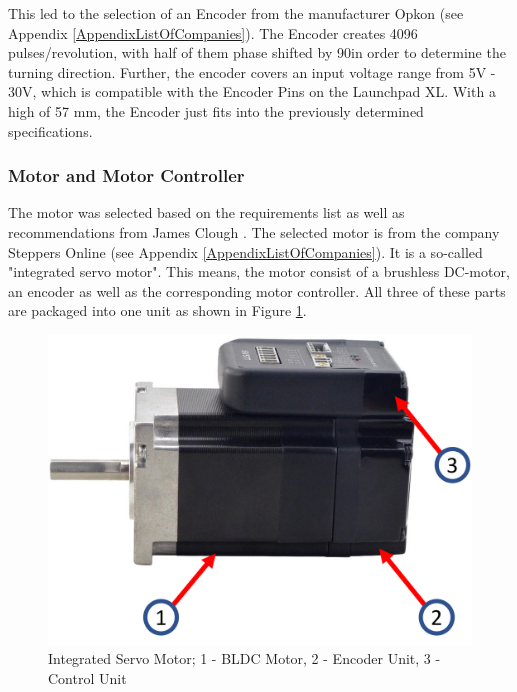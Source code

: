 This led to the selection of an Encoder from the manufacturer Opkon (see Appendix \ref{AppendixListOfCompanies}). The Encoder creates 4096 pulses/revolution, with half of them phase shifted by 90\degree in order to determine the turning direction. Further, the encoder covers an input voltage range from 5V - 30V, which is compatible with the Encoder Pins on the Launchpad XL. With a high of 57 mm, the Encoder just fits into the previously determined specifications.
 
\subsubsection{Motor and Motor Controller}
The motor was selected based on the requirements list as well as recommendations from James Clough \cite{CloughELS}. The selected motor is from the company Steppers Online (see Appendix \ref{AppendixListOfCompanies}). It is a so-called "integrated servo motor". This means, the motor consist of a brushless DC-motor, an encoder as well as the corresponding motor controller. All three of these parts are packaged into one unit as shown in Figure \ref{Integrated Servo Motor}.\\
 
\begin{figure}
    \begin{center}
    \includegraphics[width=12cm]{Pictures/IntegratedServo.png}
    \caption[Integrated Servo Motor]{Integrated Servo Motor; 1 - BLDC Motor, 2 - Encoder Unit, 3 - Control Unit}
    \label{Integrated Servo Motor}
    \end{center}
\end{figure}
 
